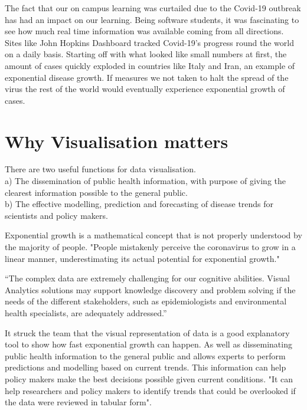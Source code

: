 \vspace{1mm}

The fact that our on campus learning was curtailed due to the Covid-19 outbreak has had an impact on our learning. Being software students, it was fascinating to see how much real time information was available coming from all directions. Sites like John Hopkins Dashboard tracked Covid-19's progress round the world on a daily basis. Starting off with what looked like small numbers at first, the amount of cases quickly exploded in countries like Italy and Iran, an example of exponential disease growth. If measures we not taken to halt the spread of the virus the rest of the world would eventually experience exponential growth of cases.\\

\vspace{1mm}
\section{Why Visualisation matters}

There are two useful functions for data visualisation.\\
a) The dissemination of public health information, with purpose of giving the clearest information possible to the general public.\\
b) The effective modelling, prediction and forecasting of disease trends for scientists and policy makers.

\vspace{5mm}

Exponential growth is a mathematical concept that is not properly understood by the majority of people.
"People mistakenly perceive the coronavirus to grow in a linear manner, underestimating its actual potential for exponential growth."\cite{lammers2020correcting}\\

\vspace{2mm}

“The complex data are extremely challenging for our cognitive abilities. Visual Analytics solutions may support knowledge discovery and problem solving if the needs of the different stakeholders, such as epidemiologists and environmental health specialists, are adequately addressed.”\cite{preim2020survey}

\vspace{5mm}



It struck the team that the visual representation of data is a good explanatory tool to show how fast exponential growth can happen. As well as disseminating public health information to the general public and allows experts to perform predictions and modelling based on current trends. This information can help policy makers make the best decisions possible given current conditions. "It can help researchers and policy makers to identify trends that could be overlooked if the data were reviewed in tabular form". \cite{tebe2020covid19}

